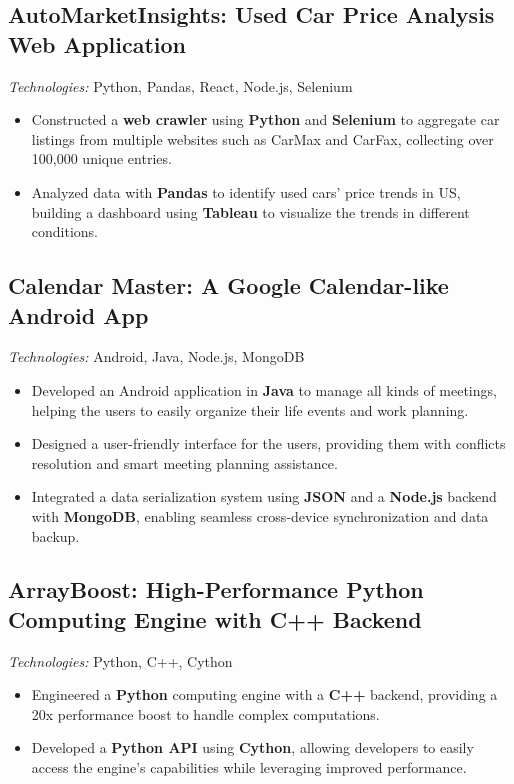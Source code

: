 \documentclass{resume}
\begin{document}
\subsection{\textbf{AutoMarketInsights: Used Car Price Analysis Web Application}}
\vspace{-2pt}
\textit{Technologies:} Python, Pandas, React, Node.js, Selenium
\vspace{-2pt}
\begin{itemize}[noitemsep]
	\item Constructed a  \textbf{web crawler} using  \textbf{Python} and  \textbf{Selenium} to aggregate car listings from multiple websites such as CarMax and CarFax, collecting over 100,000 unique entries.
	\item Analyzed data with  \textbf{Pandas} to identify used cars' price trends in US, building a dashboard using  \textbf{Tableau} to visualize the trends in different conditions.
\end{itemize}

\subsection{\textbf{Calendar Master: A Google Calendar-like Android App}}
\vspace{-2pt}
\textit{Technologies:} Android, Java, Node.js, MongoDB
\vspace{-2pt}
\begin{itemize}[noitemsep]
    \item Developed an Android application in  \textbf{Java} to manage all kinds of meetings, helping the users to easily organize their life events and work planning.
    \item Designed a user-friendly interface for the users, providing them with conflicts resolution and smart meeting planning assistance.
    \item Integrated a data serialization system using  \textbf{JSON} and a  \textbf{Node.js} backend with  \textbf{MongoDB}, enabling seamless cross-device synchronization and data backup.
\end{itemize}

\subsection{\textbf{ArrayBoost: High-Performance Python Computing Engine with C++ Backend}}
\vspace{-2pt}
\textit{Technologies:} Python, C++, Cython
\vspace{-2pt}
\begin{itemize}[noitemsep]
\item Engineered a  \textbf{Python} computing engine with a  \textbf{C++} backend, providing a 20x performance boost to handle complex computations.
\item Developed a  \textbf{Python API} using  \textbf{Cython}, allowing developers to easily access the engine’s capabilities while leveraging improved performance.
\end{itemize}
\end{document}
